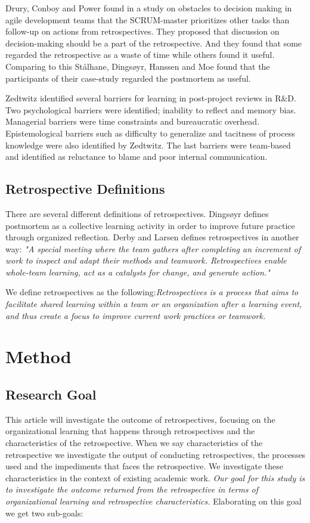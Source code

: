 \documentclass[lnbip]{svmultln}
\begin{document}
Drury, Conboy and Power\cite{Drury2012} found in a study on obstacles to decision making in agile development teams that the SCRUM-master prioritizes other tasks than follow-up on actions from retrospectives. They proposed that discussion on decision-making should be a part of the retrospective. And they found that some regarded the retrospective as a waste of time while others found it useful. Comparing to this Stålhane, Dingsøyr, Hanssen and Moe\cite{Hanssen2003} found that the participants of their case-study regarded the postmortem as useful.

Zedtwitz\cite{Zedtwitz2002} identified several barriers for learning in post-project reviews in R\&D. Two psychological barriers were identified; inability to reflect and memory bias. Managerial barriers were time constraints and bureaucratic overhead. Epistemological barriers such as difficulty to generalize and tacitness of process knowledge were also identified by Zedtwitz. The last barriers were team-based and identified as reluctance to blame and poor internal communication.

\subsection{Retrospective Definitions}
There are several different definitions of retrospectives. Dingsøyr \cite{Dingsoyr2004} defines postmortem as a collective learning activity in order to improve future practice through organized reflection. Derby and Larsen \cite{Larsen2006} defines retrospectives in another way: \textit{"A special meeting where the team gathers after completing an increment of work to inspect and adapt their methods and teamwork. Retrospectives enable whole-team learning, act as a catalysts for change, and generate action."}

We define retrospectives as the following:\textit{Retrospectives is a process that aims to facilitate shared learning within a team or an organization after a learning event, and thus create a focus to improve current work practices or teamwork.}

\section{Method}
\subsection{Research Goal}
 This article will investigate the outcome of retrospectives, focusing on the organizational learning that happens through retrospectives and the characteristics of the retrospective. When we say characteristics of the retrospective we investigate the output of conducting retrospectives, the processes used and the impediments that faces the retrospective. We investigate these characteristics in the context of existing academic work. \textit{Our goal for this study is to investigate the outcome returned from the retrospective in terms of organizational learning and retrospective characteristics.} Elaborating on this goal we get two sub-goals:
\end{document}
